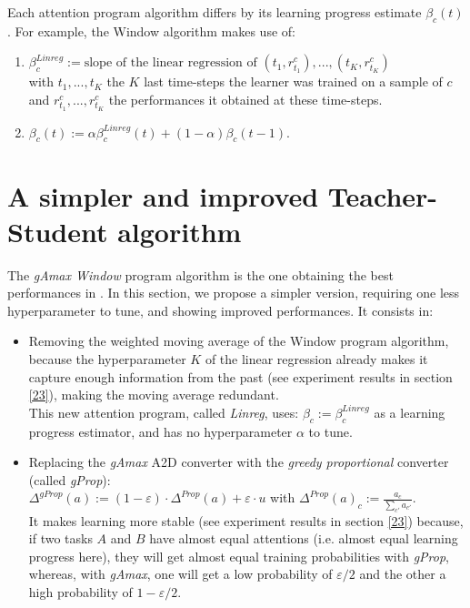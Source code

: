 \documentclass{article}
\begin{document}
Each attention program algorithm differs by its learning progress estimate \(\beta_{c}(t)\). For example, the Window algorithm makes use of:
\begin{enumerate}
    \item \(\beta^{Linreg}_c := \text{slope of the linear regression of } (t_1, r_{t_1}^c), ..., (t_K, r_{t_K}^c)\) \\
    with  \(t_1, ..., t_K\) the \(K\) last time-steps the learner was trained on a sample of \(c\) and \(r_{t_1}^c, ..., r_{t_K}^c\) the performances it obtained at these time-steps.
    \item \(\beta_{c}(t) := \alpha \beta^{Linreg}_{c}(t) + (1-\alpha)\beta_{c}(t-1)\).
\end{enumerate}


\section{A simpler and improved Teacher-Student algorithm}
\label{section3}

The \textit{gAmax Window} program algorithm is the one obtaining the best performances in \citep{matiisen2017teacher}. In this section, we propose a simpler version, requiring one less hyperparameter to tune, and showing improved performances. It consists in:
\begin{itemize}
    \item Removing the weighted moving average of the Window program algorithm, because the hyperparameter $K$ of the linear regression already makes it capture enough information from the past (see experiment results in section \ref{23}), making the moving average redundant.\\
    This new attention program, called \textit{Linreg}, uses: \(\beta_c := \beta^{Linreg}_c\) as a learning progress estimator, and has no hyperparameter $\alpha$ to tune. 
    \item Replacing the \textit{gAmax} A2D converter with the \textit{greedy proportional} converter (called \textit{gProp}):\\ \(\Delta^{gProp}(a) := (1-\varepsilon)\cdot \Delta^{Prop}(a) + \varepsilon \cdot u\) \; with \; \(\Delta^{Prop}(a)_c := \frac{a_c}{\sum_{c'} a_{c'}}\).\\
    It makes learning more stable (see experiment results in section \ref{23}) because, if two tasks $A$ and $B$ have almost equal attentions (i.e. almost equal learning progress here), they will get almost equal training probabilities with \textit{gProp}, whereas, with \textit{gAmax}, one will get a low probability of $\varepsilon/2$ and the other a high probability of $1-\varepsilon/2$.
\end{itemize}
\end{document}
